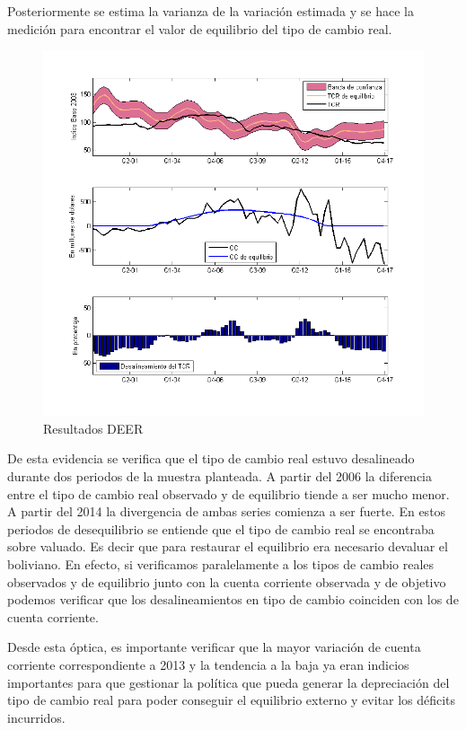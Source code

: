 \documentclass[12pt,letterpaper]{article}
\begin{document}
Posteriormente se estima la varianza de la variación estimada y se hace la medición para encontrar el valor de equilibrio del tipo de cambio real.

\begin{figure}
\caption{Resultados DEER}
\centering
\includegraphics[scale=0.7]{tcreq}
\end{figure}

De esta evidencia se verifica que el tipo de cambio real estuvo desalineado durante dos periodos de la muestra planteada. A partir del 2006 la diferencia entre el tipo de cambio real observado y de equilibrio tiende a ser mucho menor. A partir del 2014 la divergencia de ambas series comienza a ser fuerte. En estos periodos de desequilibrio se entiende que el tipo de cambio real se encontraba sobre valuado. Es decir que para restaurar el equilibrio era necesario devaluar el boliviano. En efecto, si verificamos paralelamente a los tipos de cambio reales observados y de equilibrio junto con la cuenta corriente observada y de objetivo podemos verificar que los desalineamientos en tipo de cambio coinciden con los de cuenta corriente. 

Desde esta óptica, es importante verificar que la mayor variación de cuenta corriente correspondiente a 2013 y la tendencia a la baja ya eran indicios importantes para que gestionar la política que pueda generar la depreciación del tipo de cambio real para poder conseguir el equilibrio externo y evitar los déficits incurridos.
\end{document}
